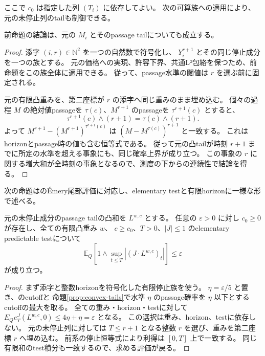 ここで $c_0$ は指定した列 $(T_i)$ に依存してよい。
次の可算族への適用により、元の未停止列のtailも制御できる。

\begin{corollary}[未停止選択族の全時刻凸尾部評価]
前命題の結論は、元の $M_i$ とそのpassage tailについても成立する。
\end{corollary}
\begin{proof}
添字 $(i,r)\in\mathbb N^2$ を一つの自然数で符号化し、
$Y_i^{r+1}$ とその同じ停止成分を一つの族とする。
元の価格への実現、許容下界、共通L²包絡を保つため、前命題をこの族全体に適用できる。
従って、passage水準の閾値は $r$ を選ぶ前に固定される。

元の有限凸重みを、第二座標が $r$ の添字へ同じ重みのまま埋め込む。
個々の過程 $M$ の絶対値passageを $\tau(c)$、$M^{r+1}$ のpassageを
$\tau^{r+1}(c)$ とすると、
\[
 \tau^{r+1}(c)\wedge(r+1)=\tau(c)\wedge(r+1).
\]
よって $M^{r+1}-(M^{r+1})^{\tau^{r+1}(c)}$
は $(M-M^{\tau(c)})^{r+1}$ と一致する。
これはhorizonとpassage時の値も含む恒等式である。
従って元の凸tailが時刻 $r+1$ までに所定の水準を超える事象にも、同じ確率上界が成り立つ。
この事象の $r$ に関する増大和が全時刻の事象となるので、測度の下からの連続性で結論を得る。
\end{proof}

次の命題は\cite[Lemma 4.9]{DS}のÉmery尾部評価に対応し、elementary testと有限horizonに一様な形で述べる。

\begin{proposition}\label{prop:test-uniform-tails}
元の未停止成分のpassage tailの凸和を $L^{w,c}$ とする。
任意の $\varepsilon>0$ に対し $c_0\geq0$ が存在し、全ての有限凸重み $w$、
$c\geq c_0$、$T>0$、$|J|\leq1$ のelementary predictable testについて
\[
 \mathbb E_Q\left[1\wedge\sup_{t\leq T}|(J\cdot L^{w,c})_t|\right]\leq\varepsilon
\]
が成り立つ。
\end{proposition}
\begin{proof}
まず添字と整数horizonを符号化した有限停止族を使う。
$\eta=\varepsilon/5$ と置き、のcutoffと
命題\ref{prop:convex-tails}で水準 $\eta$ のpassage確率を $\eta$ 以下とするcutoffの最大を取る。
全ての重み・horizon・testに対して $E_Qe_T^J(L^{w,c},0)\leq4\eta+\eta=\varepsilon$ となる。
この選択は重み、horizon、testに依存しない。
元の未停止列に対しては $T\leq r+1$ となる整数 $r$ を選び、重みを第二座標 $r$ へ埋め込む。
前系の停止恒等式により利得は $[0,T]$ 上で一致する。
同じ有限和のtest積分も一致するので、求める評価が戻る。
\end{proof}

